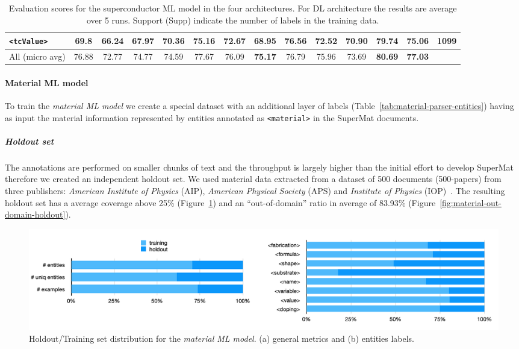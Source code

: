 \documentclass[]{interact}
\theoremstyle{plain}%
\theoremstyle{definition}
\theoremstyle{remark}
\begin{document}
\begin{table}[ht]
{\begin{tabular}{l ccc ccc ccc ccc r}
            \texttt{<tcValue>}    & 69.8                             & 66.24                                     & 67.97                                              & 70.36      & 75.16      & 72.67          & 68.95          & 76.56      & 72.52          & 70.90      & 79.74          & \textbf{75.06} & 1099 \\
            \midrule
            All (micro avg)       & 76.88                            & 72.77                                     & 74.77                                              & 74.59      & 77.67      & 76.09          & \textbf{75.17} & 76.79      & 75.96          & 73.69      & \textbf{80.69} & \textbf{77.03}        \\
            \bottomrule
        \end{tabular}
    }
    \caption{\label{tab:evaluation-superconductors-ML-model} Evaluation scores for the superconductor ML model in the four architectures. For DL architecture the results are average over 5 runs. Support (Supp) indicate the number of labels in the training data. }
\end{table}

\paragraph*{Material ML model}

To train the \textit{material ML model} we create a special dataset with an additional layer of labels (Table~\ref{tab:material-parser-entities}) having as input the material information represented by entities annotated as \texttt{<material>} in the SuperMat documents.

\subparagraph*{Holdout set}
The annotations are performed on smaller chunks of text and the throughput is largely higher than the initial effort to develop SuperMat therefore we created an independent holdout set.
We used material data extracted from a dataset of 500 documents (500-papers) from three publishers: \textit{American Institute of Physics} (AIP), \textit{American Physical Society} (APS) and \textit{Institute of Physics} (IOP)~\cite{foppiano2019proposal}.
The resulting holdout set has a average coverage above 25\% (Figure~\ref{fig:material-training-holdout-set-distribution}) and an ``out-of-domain'' ratio in average of 83.93\% (Figure~\ref{fig:material-out-domain-holdout}).

\begin{figure}[ht]
    \centering
    \includegraphics[width=\textwidth]{material-holdout-training-set}
    \caption{Holdout/Training set distribution for the \textit{material ML model}. (a) general metrics and (b) entities labels.}
    \label{fig:material-training-holdout-set-distribution}
\end{figure}
\end{document}
